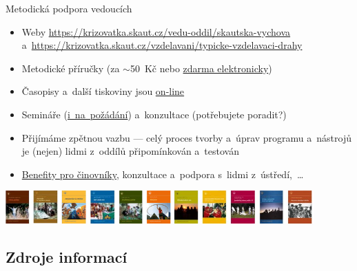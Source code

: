 \documentclass[compress, ucs, xelatex, 11pt, xcolor=dvipsnames, print, aspectratio=169,
	hyperref={
		bookmarks=true,
		unicode=true,
		colorlinks=true,
		pdftitle={Skautska vychovna metoda},
		plainpages=false,
		pdfauthor={Vojtech Zeisek},
		pdfsubject={Skautska vychovna metoda a jeji vyvoj za posledni stoleti a desetileti},
		pdfcreator={XeLaTeX},
		pdfkeywords={Junak, Pedagogika, Skaut, Skauting, Vychovna metoda},
		linkcolor=Red, %
		anchorcolor=ForestGreen, %
		citecolor=ForestGreen, %
		filecolor=ForestGreen, %
		menucolor=ForestGreen, %
		urlcolor=Sepia, %
		pdftex},
	url={hyphens, lowtilde} %
	]{beamer}
\begin{document}
\begin{frame}{Metodická podpora vedoucích}
	\begin{itemize}
		\item Weby \url{https://krizovatka.skaut.cz/vedu-oddil/skautska-vychova} a~\url{https://krizovatka.skaut.cz/vzdelavani/typicke-vzdelavaci-drahy}
		\item Metodické příručky (za $\sim$50~Kč nebo \href{https://www.obchod.skaut.cz/index.php?tpl=&_artperpage=99&cl=alist&searchparam=&cnid=701}{zdarma elektronicky})
		\item Časopisy a~další tiskoviny jsou \href{https://casopisy.skaut.cz/}{on-line}
		\item Semináře (\href{https://krizovatka.skaut.cz/vzdelavani/vzdelavani-na-klic}{i~na~požádání}) a~konzultace (potřebujete poradit?)
		\item Přijímáme zpětnou vazbu --- celý proces tvorby a~úprav programu a~nástrojů je (nejen) lidmi z~oddílů připomínkován a~testován
		\item \href{https://krizovatka.skaut.cz/skautske-benefity}{Benefity pro činovníky}, konzultace a~podpora s~lidmi z~ústředí,~\ldots
	\end{itemize}
	\begin{center}
		\includegraphics[height=1.25cm]{prirucky.png}
	\end{center}
\end{frame}

\subsection{Zdroje informací}
\end{document}
